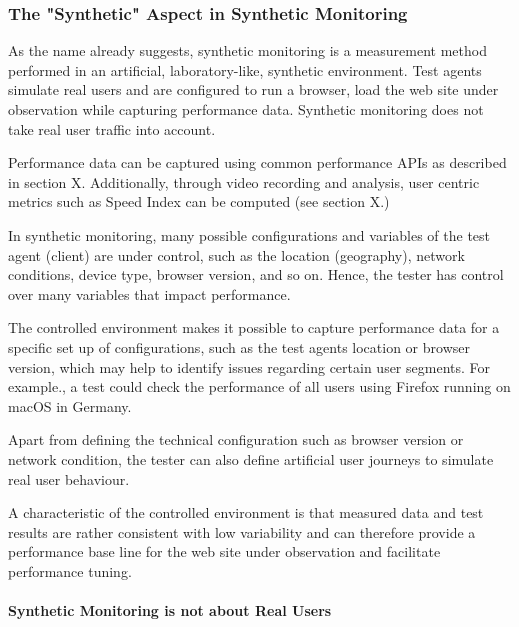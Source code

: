 \subsubsection{The "Synthetic" Aspect in Synthetic Monitoring}


As the name already suggests, synthetic monitoring is a measurement method performed in an artificial, laboratory-like, synthetic environment.
Test agents simulate real users and are configured to run a browser, load the web site under observation while capturing performance data.
Synthetic monitoring does not take real user traffic into account. %

Performance data can be captured using common performance APIs as described in section X.
Additionally, through video recording and analysis,  user centric metrics such as Speed Index can be computed (see section X.) %

In synthetic monitoring, many possible configurations and variables of the test agent (client) are under control, such as the location (geography), network conditions, device type, browser version, and so on. %
Hence, the tester has control over many variables that impact performance. %

The controlled environment makes it possible to capture performance data for a specific set up of configurations, such as the test agents location or browser version, which may help to identify issues regarding certain user segments.  For example., a test could check the performance of all users using Firefox running on macOS in Germany. %

Apart from defining the technical configuration such as browser version or network condition, the tester can also define artificial user journeys to simulate real user behaviour. %

A characteristic of the controlled environment is that measured data and test results are rather consistent with low variability and can therefore provide a performance base line for the web site under observation and facilitate performance tuning.%


\paragraph{Synthetic Monitoring is not about Real Users}

